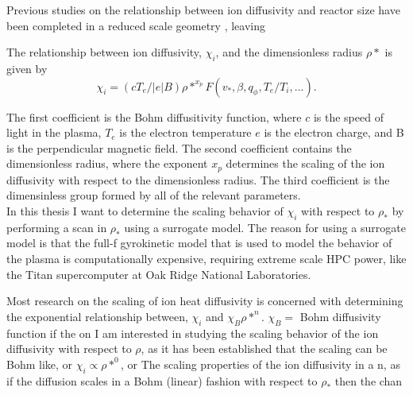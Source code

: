 \documentclass{article}
\begin{document}
Previous studies on the relationship between ion diffusivity and reactor size have been completed in a reduced scale geometry \cite{Yas_Ido}, leaving


The relationship between ion diffusivity, $\chi_i$, and the dimensionless radius $\rho*$ is given by
$$
\chi_i = (cT_e/|e|B )\rho*^{x_p}F(v_*, \beta, q_{\phi}, T_e/T_i, ...).
$$

The first coefficient is the Bohm diffusitivity function, where $c$ is the speed of light in the plasma, $T_e$ is the electron temperature $e$ is the electron charge, and B is the perpendicular magnetic field. The second coefficient contains the dimensionless radius, where the exponent $x_p$ determines the scaling of the ion diffusivity with respect to the dimensionless radius. The third coefficient is the dimensinless group formed by all of the relevant parameters.\\

In this thesis I want to determine the scaling behavior of $\chi_i$ with respect to $\rho_*$ by performing a scan in $\rho_*$ using a surrogate model. The reason for using a surrogate model is that the full-f gyrokinetic model that is used to model the behavior of the plasma is computationally expensive, requiring extreme scale HPC power, like the Titan supercomputer at Oak Ridge National Laboratories.
%


Most research on the scaling of ion heat diffusivity is concerned with determining the exponential relationship between,  $\chi_i$ and $\chi_B\rho*^{n}$. $\chi_B = $ Bohm diffusivity function if the   on  I am interested in studying the scaling behavior of the ion diffusivity with respect to $\rho$, as it has been established that the scaling can be Bohm like, or $\chi_i \propto  \rho*^0$, or  The scaling properties of the ion diffusivity in a n, as if the diffusion scales in a Bohm (linear) fashion with respect to $\rho_*$ then the chan
\end{document}
